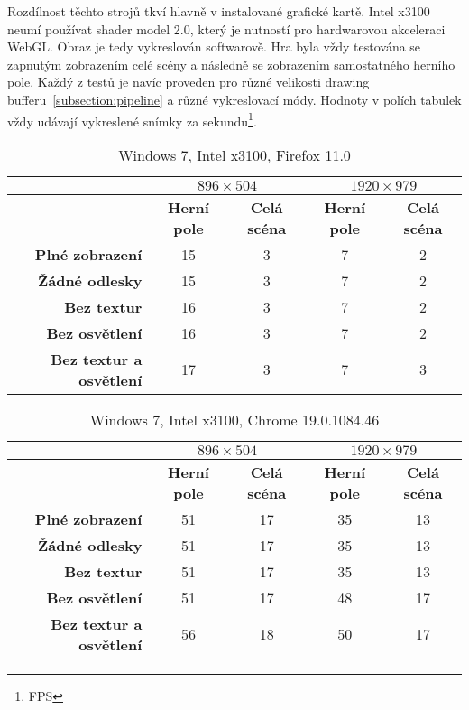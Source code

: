 Rozdílnost těchto strojů tkví hlavně v instalované grafické kartě. Intel x3100 neumí používat shader model 2.0, který je nutností pro hardwarovou akceleraci WebGL. Obraz je tedy vykreslován softwarově. Hra byla vždy testována se zapnutým zobrazením celé scény a následně se zobrazením samostatného herního pole. Každý z testů je navíc proveden pro různé velikosti drawing bufferu~\ref{subsection:pipeline} a různé vykreslovací módy. Hodnoty v polích tabulek vždy udávají vykreslené snímky za sekundu\footnote{FPS}.


\begin{table}[!ht]
\begin{center}
\begin{tabular}{ | r | c | c | c | c |}
\hline
 & \multicolumn{2}{|c|}{$896 \times 504$} & \multicolumn{2}{|c|}{$1920 \times 979$} \\ \hline
 & \textbf{Herní pole} & \textbf{Celá scéna} & \textbf{Herní pole} & \textbf{Celá scéna} \\ \hline
\textbf{Plné zobrazení} & 15 & 3 & 7 & 2 \\ \hline
\textbf{Žádné odlesky} & 15 & 3 & 7 & 2 \\ \hline
\textbf{Bez textur} & 16 & 3 & 7 & 2 \\ \hline
\textbf{Bez osvětlení} & 16 & 3 & 7 & 2 \\ \hline
\textbf{Bez textur a osvětlení} & 17 & 3 & 7 & 3 \\ \hline
\end{tabular}
\end{center}
\caption{Windows 7, Intel x3100, Firefox 11.0}
\end{table}

\begin{table}[!ht]
\begin{center}
\begin{tabular}{ | r | c | c | c | c |}
\hline
 & \multicolumn{2}{|c|}{$896 \times 504$} & \multicolumn{2}{|c|}{$1920 \times 979$} \\ \hline
 & \textbf{Herní pole} & \textbf{Celá scéna} & \textbf{Herní pole} & \textbf{Celá scéna} \\ \hline
\textbf{Plné zobrazení} & 51 & 17  & 35 & 13 \\ \hline
\textbf{Žádné odlesky} & 51 & 17  & 35 & 13 \\ \hline
\textbf{Bez textur} & 51 & 17& 35 & 13 \\ \hline
\textbf{Bez osvětlení} & 51 & 17 & 48 & 17 \\ \hline
\textbf{Bez textur a osvětlení} & 56 & 18 & 50 & 17 \\ \hline
\end{tabular}
\end{center}
\caption{Windows 7, Intel x3100, Chrome 19.0.1084.46}
\end{table}

